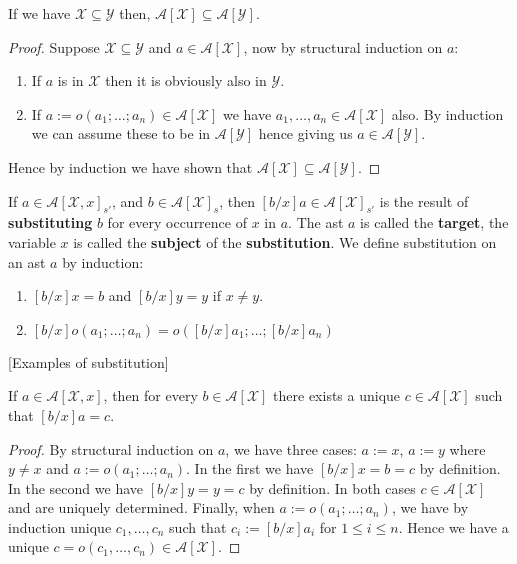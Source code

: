 \begin{lemma}
    If we have $\mathcal{X} \subseteq \mathcal{Y}$ then, $\mathcal{A}[\mathcal{X}] \subseteq \mathcal{A}[\mathcal{Y}]$.
\end{lemma}
\begin{proof}
    Suppose $\mathcal{X} \subseteq \mathcal{Y}$ and $a \in \mathcal{A}[\mathcal{X}]$, now by structural induction on $a$:
    
    \begin{enumerate}
        \item If $a$ is in $\mathcal{X}$ then it is obviously also in $\mathcal{Y}$.
        \item If $a := o(a_1;\dots;a_n) \in \mathcal{A}[\mathcal{X}]$ we have $a_1, \dots, a_n\in \mathcal{A}[\mathcal{X}]$ also. By induction we can assume these to be in $\mathcal{A}[\mathcal{Y}]$ hence giving us $a \in \mathcal{A}[\mathcal{Y}]$.
    \end{enumerate}
    
    Hence by induction we have shown that $\mathcal{A}[\mathcal{X}] \subseteq \mathcal{A}[\mathcal{Y}]$.
\end{proof}

\begin{defin}[Substitution]
    If $a \in \mathcal{A}[\mathcal{X},x]_{s'}$, and $b \in \mathcal{A}[\mathcal{X}]_s$, then $[b/x]a \in \mathcal{A}[\mathcal{X}]_{s'}$ is the result of \textbf{substituting} $b$ for every occurrence of $x$ in $a$. The ast $a$ is called the \textbf{target}, the variable $x$ is called the \textbf{subject} of the \textbf{substitution}. We define substitution on an ast $a$ by induction:
    \begin{enumerate}
        \item $[b/x]x = b$ and $[b/x]y = y$ if $x\ne y$.
        \item $[b/x]o(a_1;\dots;a_n)=o([b/x]a_1;\dots;[b/x]a_n)$
    \end{enumerate}
\end{defin}

[Examples of substitution]

\begin{theorem}
    If $a \in \mathcal{A}[\mathcal{X},x]$, then for every $b \in \mathcal{A}[\mathcal{X}]$ there exists a unique $c \in \mathcal{A}[\mathcal{X}]$ such that $[b/x]a = c$.
\end{theorem}
\begin{proof}
    By structural induction on $a$, we have three cases: $a := x$, $a:=y$ where $y \ne x$ and $a := o(a_1; \dots; a_n)$. In the first we have $[b/x]x=b=c$ by definition. In the second we have $[b/x]y=y=c$ by definition. In both cases $c \in \mathcal{A}[\mathcal{X}]$ and are uniquely determined. Finally, when $a := o(a_1; \dots; a_n)$, we have by induction unique $c_1,\dots, c_n$ such that $c_i:=[b/x]a_i$ for $1 \le i \le n$. Hence we have a unique $c=o(c_1,\dots,c_n) \in \mathcal{A}[\mathcal{X}]$.

\end{proof}








